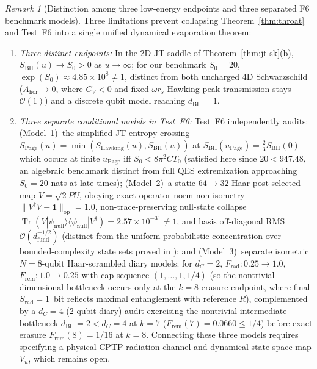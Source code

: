 \documentclass[11pt,a4paper]{article}
\theoremstyle{definition}
\theoremstyle{remark}
\newtheorem{remark}{Remark}
\newcommand{\Tr}{\operatorname{Tr}}
\newcommand{\1}{\mathbf{1}}
\begin{document}
\begin{remark}[Distinction among three low-energy endpoints and three separated F6 benchmark models]\label{rem:three-endpoints}
Three limitations prevent collapsing Theorem~\ref{thm:throat} and Test~F6 into a single unified dynamical evaporation theorem:
\begin{enumerate}
  \item \emph{Three distinct endpoints:} In the 2D JT saddle of Theorem~\ref{thm:jt-sk}(b), $S_{\mathrm{BH}}(u)\to S_0 > 0$ as $u\to\infty$; for our benchmark $S_0 = 20$, $\exp(S_0) \approx 4.85\times 10^8 \neq 1$, distinct from both uncharged 4D Schwarzschild ($A_{\mathrm{hor}}\to 0$, where $C_V<0$ and fixed-$\omega r_s$ Hawking-peak transmission stays $\mathcal{O}(1)$) and a discrete qubit model reaching $d_{\mathrm{BH}}=1$.
  \item \emph{Three separate conditional models in Test~F6:} Test~F6 independently audits: (Model~1)~the simplified JT entropy crossing $S_{\mathrm{Page}}(u)=\min(S_{\mathrm{Hawking}}(u), S_{\mathrm{BH}}(u))$ at $S_{\mathrm{BH}}(u_{\mathrm{Page}})=\frac{2}{3}S_{\mathrm{BH}}(0)$---which occurs at finite $u_{\mathrm{Page}}$ iff $S_0 < 8\pi^2 C T_0$ (satisfied here since $20 < 947.48$, an algebraic benchmark distinct from full QES extremization \cite{AEMM2019} approaching $S_0=20$ nats at late times); (Model~2)~a static $64\to 32$ Haar post-selected map $V=\sqrt{2}PU$, obeying exact operator-norm non-isometry $\|V^\dagger V - \1\|_{\mathrm{op}}=1.0$, non-trace-preserving null-state collapse $\Tr(V|\psi_{\mathrm{null}}\rangle\langle\psi_{\mathrm{null}}|V^\dagger)=2.57\times 10^{-31}\neq 1$, and basis off-diagonal RMS $\mathcal{O}(d_{\mathrm{fund}}^{-1/2})$ (distinct from the uniform probabilistic concentration over bounded-complexity state sets proved in \cite{Akers2022}); and (Model~3)~separate isometric $N=8$-qubit Haar-scrambled diary models: for $d_C=2$, $F_{\mathrm{rad}}:0.25\to 1.0$, $F_{\mathrm{rem}}:1.0\to 0.25$ with cap sequence $(1,\dots,1,1/4)$ (so the nontrivial dimensional bottleneck occurs only at the $k=8$ erasure endpoint, where final $S_{\mathrm{rad}}=1$~bit reflects maximal entanglement with reference $R$), complemented by a $d_C=4$ (2-qubit diary) audit exercising the nontrivial intermediate bottleneck $d_{\mathrm{BH}}=2<d_C=4$ at $k=7$ ($F_{\mathrm{rem}}(7)=0.0660\le 1/4$) before exact erasure $F_{\mathrm{rem}}(8)=1/16$ at $k=8$. Connecting these three models requires specifying a physical CPTP radiation channel and dynamical state-space map $V_u$, which remains open.
\end{enumerate}
\end{remark}
\end{document}
